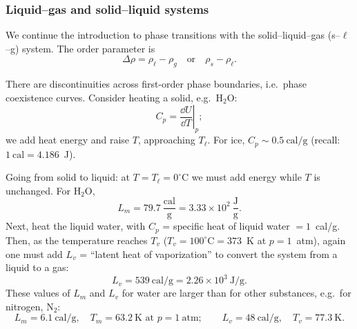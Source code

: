 \subsubsection*{Liquid--gas and solid--liquid systems}

We continue the introduction to phase transitions with the solid--liquid--gas
(s--$\ell$--g) system. The order parameter is
\begin{equation}
  \Delta\rho = \rho_\ell - \rho_g \quad\text{or}\quad \rho_s-\rho_\ell .
\end{equation}

\begin{diagram}
\end{diagram}

There are discontinuities across first-order phase boundaries, i.e.\ phase
coexistence curves. Consider heating a solid, e.g.\ H$_2$O:
\begin{equation}
  C_p = \left.\frac{\dd U}{\dd T}\right|_p ;
\end{equation}
we add heat energy and raise $T$, approaching $T_\ell$. For ice,
$C_p\sim 0.5\ \text{cal/g}$ (recall: $1\ \text{cal} = 4.186$~J).

Going from solid to liquid: at $T = T_\ell = 0^\circ$C we must add energy while $T$ is
unchanged. For H$_2$O,
\begin{equation}
  L_m = 79.7\ \frac{\text{cal}}{\text{g}} = 3.33\times 10^2\ \frac{\text{J}}{\text{g}}.
\end{equation}
Next, heat the liquid water, with $C_p$ = specific heat of liquid water
$= 1$~cal/g. Then, as the temperature reaches $T_v$ ($T_v = 100^\circ\text{C} = 373$~K
at $p = 1$~atm), again one must add $L_v$ = ``latent heat of vaporization'' to convert
the system from a liquid to a gas:
\begin{equation}
  L_v = 539\ \text{cal/g} = 2.26\times 10^3\ \text{J/g}.
\end{equation}
These values of $L_m$ and $L_v$ for water are larger than for other substances, e.g.\
for nitrogen, N$_2$:
\begin{equation}
  L_m = 6.1\ \text{cal/g},\quad T_m = 63.2\ \text{K at } p = 1\ \text{atm};\qquad
  L_v = 48\ \text{cal/g},\quad T_v = 77.3\ \text{K}.
\end{equation}

